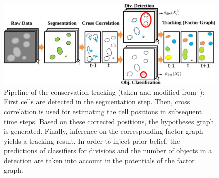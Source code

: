 \begin{figure}
    \centering
    \includegraphics[width=\textwidth]{images/conservation/pipeline.png}
    \caption[Conservation tracking pipeline]{Pipeline of the conservation tracking (taken and modified
        from~\cite{schiegg_13_conservation}): First cells are detected in the segmentation
        step. Then, cross correlation is used for estimating the cell positions in subsequent
        time steps. Based on these corrected positions, the hypotheses graph is generated. Finally,
        inference on the corresponding factor graph yields a tracking result. In order to inject
        prior belief, the predictions of classifiers for divisions and the number of objects in a
        detection are taken into account in the potentials of the factor graph.} 
    \label{fig:fg-conservation-pipeline}
\end{figure}

